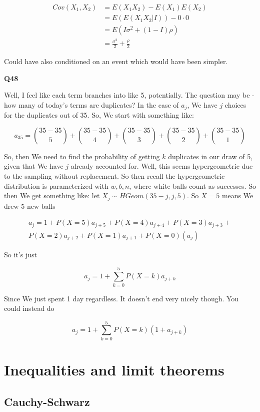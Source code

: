 \documentclass{article}
\newcommand\blankpage{%
    \null
    \thispagestyle{empty}%
    \addtocounter{page}{-1}%
    \newpage}
\begin{document}
			\begin{align*}
			Cov(X_1, X_2) &= E(X_1X_2) -E(X_1)E(X_2) \\
			&= E(E(X_1X_2|I)) -0\cdot 0\\
			&=E(I\sigma^2 + (1-I)\rho)\\
			&= \frac{\sigma^2}{2} + \frac{\rho}{2}
			\end{align*}
			
			Could have also conditioned on an event which would have been simpler.
			
			\hfill
			
		\textbf{Q48}
		
			Well, I feel like each term branches into like 5, potentially. The question may be - how many of today's terms are duplicates? In the case of $a_j$, We have $j$ choices for the duplicates out of 35. So, We start with something like: 
			
			\[ a_{35} = {35-35\choose 5} + {35-35\choose 4} + {35-35\choose 3} + {35-35\choose 2} + {35-35\choose 1} \]
			
			So, then We need to find the probability of getting $k$ duplicates in our draw of 5, given that We have $j$ already accounted for. Well, this seems hypergeometric due to the sampling without replacement. So then recall the hypergeometric distribution is parameterized with $w, b, n$, where white balls count as successes. So then We get something like: let $X_j\sim HGeom(35-j, j, 5)$. So $X=5$ means We drew 5 new balls
			
			\begin{multline*}
			a_j = 1 + P(X=5)a_{j+5} + P(X=4)a_{j+4} + P(X=3)a_{j+3} + \\
			P(X=2)a_{j+2} + P(X=1)a_{j+1} + P(X=0)(a_j)
			\end{multline*}
			
			So it's just
			
			\[ a_j = 1 + \sum^5_{k=0} P(X=k)a_{j+k} \]
			
			Since We just spent 1 day regardless. It doesn't end very nicely though. You could instead do
			
			\[ a_j = 1 + \sum^5_{k=0} P(X=k)(1+a_{j+k}) \]
	
\blankpage		
\section{Inequalities and limit theorems}

	\subsection{Cauchy-Schwarz}
\end{document}
